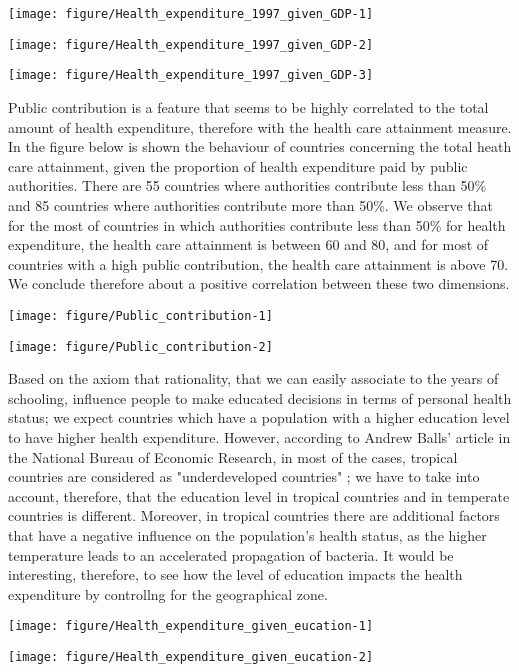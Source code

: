 \documentclass[12pt,a4paper]{article}\usepackage[]{graphicx}\usepackage[]{color}
\makeatletter
\def\maxwidth{ %
  \ifdim\Gin@nat@width>\linewidth
    \linewidth
  \else
    \Gin@nat@width
  \fi
}
\makeatother
\begin{document}
\texttt{[image: figure/Health\_expenditure\_1997\_given\_GDP-1]} 

\texttt{[image: figure/Health\_expenditure\_1997\_given\_GDP-2]} 

\texttt{[image: figure/Health\_expenditure\_1997\_given\_GDP-3]} 


Public contribution is a feature that seems to be highly correlated to the total amount of health expenditure, therefore with the health care attainment measure. In the figure below is shown the behaviour of countries concerning the total heath care attainment, given the proportion of health expenditure paid by public authorities.  There are 55 countries where authorities contribute less than 50\% and 85 countries where authorities contribute more than 50\%. We observe that for the most of countries in which authorities contribute less than 50\% for health expenditure, the health care attainment is between 60 and 80, and for most of countries with a high public contribution, the health care attainment is above 70. We conclude therefore about a positive correlation between these two dimensions.

\texttt{[image: figure/Public\_contribution-1]} 

\texttt{[image: figure/Public\_contribution-2]} 



Based on the axiom that  rationality, that we can easily associate to the years of schooling, influence people to make educated decisions in terms of personal health status; we expect countries which have a population with a higher education level to have higher health expenditure. However, according to Andrew Balls' article in the National Bureau of Economic Research, in most of the cases, tropical countries are considered as "underdeveloped countries" ; we have to take into account, therefore,  that the education level in tropical countries and in temperate  countries is different. Moreover, in tropical countries there are additional factors that have a negative influence on the population's health status, as the higher temperature leads to an accelerated propagation of bacteria.  It would be interesting, therefore, to see how the level of education impacts the health expenditure by controllng for the geographical zone.


\texttt{[image: figure/Health\_expenditure\_given\_eucation-1]} 

\texttt{[image: figure/Health\_expenditure\_given\_eucation-2]} 
\end{document}
